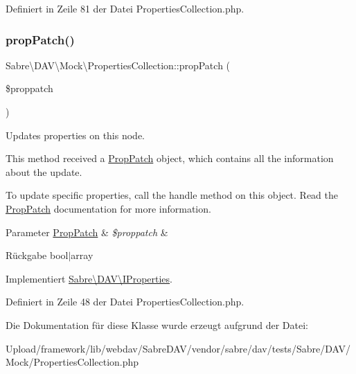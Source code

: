 Definiert in Zeile 81 der Datei Properties\+Collection.\+php.

\mbox{\label{class_sabre_1_1_d_a_v_1_1_mock_1_1_properties_collection_a2226758ceb984e4c151a89973564e1f6}} 
\subsubsection{\texorpdfstring{prop\+Patch()}{propPatch()}}
{\footnotesize\ttfamily Sabre\textbackslash{}\+D\+A\+V\textbackslash{}\+Mock\textbackslash{}\+Properties\+Collection\+::prop\+Patch (\begin{DoxyParamCaption}\item[{\mbox{\hyperlink{class_sabre_1_1_d_a_v_1_1_prop_patch}{Prop\+Patch}}}]{\$proppatch }\end{DoxyParamCaption})}

Updates properties on this node.

This method received a \mbox{\hyperlink{class_sabre_1_1_d_a_v_1_1_prop_patch}{Prop\+Patch}} object, which contains all the information about the update.

To update specific properties, call the \textquotesingle{}handle\textquotesingle{} method on this object. Read the \mbox{\hyperlink{class_sabre_1_1_d_a_v_1_1_prop_patch}{Prop\+Patch}} documentation for more information.


\begin{DoxyParams}[1]{Parameter}
\mbox{\hyperlink{class_sabre_1_1_d_a_v_1_1_prop_patch}{Prop\+Patch}} & {\em \$proppatch} & \\
\hline
\end{DoxyParams}
\begin{DoxyReturn}{Rückgabe}
bool$\vert$array 
\end{DoxyReturn}


Implementiert \mbox{\hyperlink{interface_sabre_1_1_d_a_v_1_1_i_properties_a90973262bb85b17f98183ecd600acd84}{Sabre\textbackslash{}\+D\+A\+V\textbackslash{}\+I\+Properties}}.



Definiert in Zeile 48 der Datei Properties\+Collection.\+php.



Die Dokumentation für diese Klasse wurde erzeugt aufgrund der Datei\+:\begin{DoxyCompactItemize}
\item 
Upload/framework/lib/webdav/\+Sabre\+D\+A\+V/vendor/sabre/dav/tests/\+Sabre/\+D\+A\+V/\+Mock/Properties\+Collection.\+php\end{DoxyCompactItemize}
